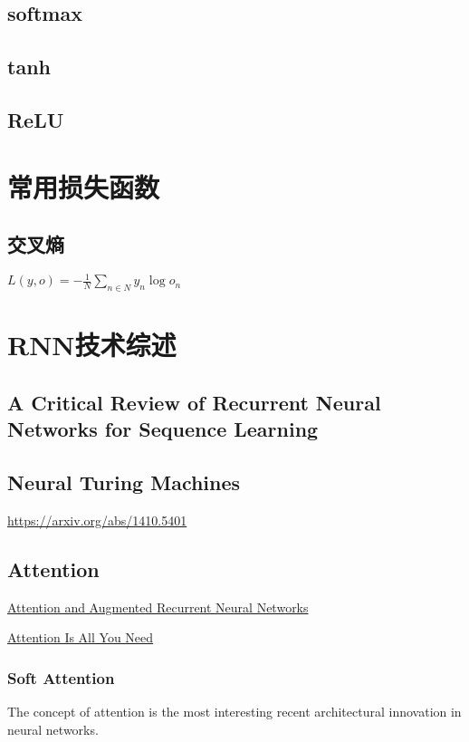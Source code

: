\documentclass[10pt,a4paper]{ctexbook}
\begin{document}
\subsection{softmax}
\subsection{tanh}
\subsection{ReLU}

\section{常用损失函数}
\subsection{交叉熵}

$L(y,o)=-\frac{1}{N}\sum\limits_{n \in N}{y_{n}\log{o_{n}}}$

\section{RNN技术综述}

\subsection{A Critical Review of Recurrent Neural Networks for Sequence Learning}

\subsection{Neural Turing Machines}
\href{Neural Turing Machines}{https://arxiv.org/abs/1410.5401}

\subsection{Attention}
\href{https://distill.pub/2016/augmented-rnns/}{Attention and Augmented Recurrent Neural Networks}

\href{https://arxiv.org/abs/1706.03762}{Attention Is All You Need}

\subsubsection{Soft Attention}
The concept of attention is the most interesting recent architectural innovation in neural networks.
\end{document}
